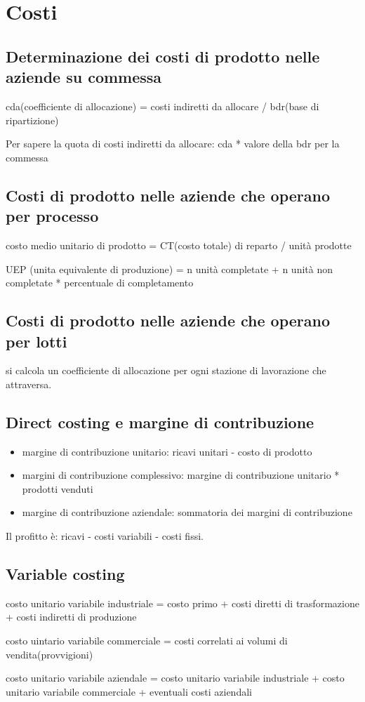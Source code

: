 \section{Costi}
\subsection{Determinazione dei costi di prodotto nelle aziende su commessa}
cda(coefficiente di allocazione) = costi indiretti da allocare / bdr(base di ripartizione)

Per sapere la quota di costi indiretti da allocare:
cda * valore della bdr per la commessa


\subsection{Costi di prodotto nelle aziende che operano per processo}
costo medio unitario di prodotto = CT(costo totale) di reparto / unità prodotte


UEP (unita equivalente di produzione) = n unità completate + n unità non completate * percentuale di completamento


\subsection{Costi di prodotto nelle aziende che operano per lotti}


si calcola un coefficiente di allocazione per ogni stazione di lavorazione che attraversa.

\subsection{Direct costing e margine di contribuzione}

\begin{itemize}
    \item margine di contribuzione unitario: ricavi unitari - costo di prodotto
    \item margini di contribuzione complessivo: margine di contribuzione unitario * prodotti venduti
    \item margine di contribuzione aziendale: sommatoria dei margini di contribuzione 
\end{itemize}



Il profitto è: ricavi - costi variabili - costi fissi.


\subsection{Variable costing}
costo unitario variabile industriale = costo primo + costi diretti di trasformazione + costi indiretti di produzione


costo uintario variabile commerciale = costi correlati ai volumi di vendita(provvigioni)


costo unitario variabile aziendale = costo unitario variabile industriale + costo unitario variabile commerciale + eventuali costi aziendali



